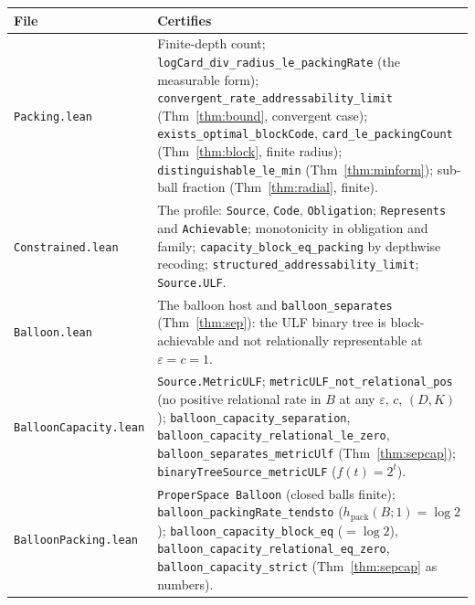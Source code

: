 \documentclass[11pt,reqno]{amsart}
\theoremstyle{plain}
\theoremstyle{definition}
\newcommand{\hpack}{h_{\mathrm{pack}}}
\newcommand{\eps}{\varepsilon}
\begin{document}
{\footnotesize
\begin{longtable}{@{}>{\raggedright\arraybackslash}p{3.9cm}>{\raggedright\arraybackslash}p{9.7cm}@{}}
\toprule
\textbf{File} & \textbf{Certifies} \\
\midrule
\texttt{Packing.lean} & Finite-depth count; \texttt{logCard\_\allowbreak{}div\_\allowbreak{}radius\_\allowbreak{}le\_\allowbreak{}packingRate} (the measurable form); \texttt{convergent\_\allowbreak{}rate\_\allowbreak{}addressability\_\allowbreak{}limit} (Thm~\ref{thm:bound}, convergent case); \texttt{exists\_\allowbreak{}optimal\_\allowbreak{}blockCode}, \texttt{card\_\allowbreak{}le\_\allowbreak{}packingCount} (Thm~\ref{thm:block}, finite radius); \texttt{distinguishable\_\allowbreak{}le\_\allowbreak{}min} (Thm~\ref{thm:minform}); sub-ball fraction (Thm~\ref{thm:radial}, finite). \\
\texttt{Constrained.lean} & The profile: \texttt{Source}, \texttt{Code}, \texttt{Obligation}; \texttt{Represents} and \texttt{Achievable}; monotonicity in obligation and family; \texttt{capacity\_\allowbreak{}block\_\allowbreak{}eq\_\allowbreak{}packing} by depthwise recoding; \texttt{structured\_\allowbreak{}addressability\_\allowbreak{}limit}; \texttt{Source.ULF}. \\
\texttt{Balloon.lean} & The balloon host and \texttt{balloon\_\allowbreak{}separates} (Thm~\ref{thm:sep}): the ULF binary tree is block-achievable and not relationally representable at $\eps=c=1$. \\
\texttt{BalloonCapacity.lean} & \texttt{Source.MetricULF}; \texttt{metricULF\_\allowbreak{}not\_\allowbreak{}relational\_\allowbreak{}pos} (no positive relational rate in $B$ at any $\eps$, $c$, $(D,K)$); \texttt{balloon\_\allowbreak{}capacity\_\allowbreak{}separation}, \texttt{balloon\_\allowbreak{}capacity\_\allowbreak{}relational\_\allowbreak{}le\_\allowbreak{}zero}, \texttt{balloon\_\allowbreak{}separates\_\allowbreak{}metricUlf} (Thm~\ref{thm:sepcap}); \texttt{binaryTreeSource\_\allowbreak{}metricULF} ($f(t)=2^t$). \\
\texttt{BalloonPacking.lean} & \texttt{ProperSpace Balloon} (closed balls finite); \texttt{balloon\_\allowbreak{}packingRate\_\allowbreak{}tendsto} ($\hpack(B;1)=\log2$); \texttt{balloon\_\allowbreak{}capacity\_\allowbreak{}block\_\allowbreak{}eq} ($=\log2$), \texttt{balloon\_\allowbreak{}capacity\_\allowbreak{}relational\_\allowbreak{}eq\_\allowbreak{}zero}, \texttt{balloon\_\allowbreak{}capacity\_\allowbreak{}strict} (Thm~\ref{thm:sepcap} as numbers). \\

\end{longtable}}
\end{document}
